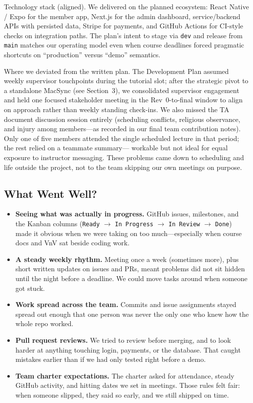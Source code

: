 \documentclass{article}
\begin{document}
Technology stack (aligned). We delivered on the planned ecosystem:
React Native / Expo for the member app, Next.js for the admin
dashboard, service/backend APIs with persisted data, Stripe for
payments, and GitHub Actions for CI-style checks on integration paths.
The plan's intent to stage via \texttt{dev} and release from \texttt{main} matches
our operating model even when course deadlines forced pragmatic shortcuts on
``production'' versus ``demo'' semantics.

Where we deviated from the written plan. The Development Plan assumed
weekly supervisor touchpoints during the tutorial slot; after the
strategic pivot to a standalone MacSync (see Section~3), we
consolidated supervisor engagement and held one focused
stakeholder meeting in the Rev~0-to-final window to align on approach rather
than weekly standing check-ins. We also missed the TA document
discussion session entirely (scheduling conflicts, religious observance, and
injury among members---as recorded in our final team contribution notes). Only
one of five members attended the single scheduled lecture in that period;
the rest relied on a teammate summary--- workable but not ideal for equal
exposure to instructor messaging. These problems came down to scheduling
and life outside the project, not to the team skipping our own meetings on
purpose.

\subsection{What Went Well?}

\begin{itemize}
  \item \textbf{Seeing what was actually in progress.} GitHub issues, milestones,
        and the Kanban columns (\texttt{Ready} $\rightarrow$ \texttt{In Progress}
        $\rightarrow$ \texttt{In Review} $\rightarrow$ \texttt{Done}) made it
        obvious when we were taking on too much---especially when course docs and
        VnV sat beside coding work.
  \item \textbf{A steady weekly rhythm.} Meeting once a week (sometimes more),
        plus short written updates on issues and PRs, meant problems did not sit
        hidden until the night before a deadline. We could move tasks around when
        someone got stuck.
  \item \textbf{Work spread across the team.} Commits and issue assignments stayed
        spread out enough that one person was never the only one who knew how the
        whole repo worked.
  \item \textbf{Pull request reviews.} We tried to review before merging, and to
        look harder at anything touching login, payments, or the database. That
        caught mistakes earlier than if we had only tested right before a demo.
  \item \textbf{Team charter expectations.} The charter asked for attendance,
        steady GitHub activity, and hitting dates we set in meetings. Those rules
        felt fair: when someone slipped, they said so early, and we still shipped
        on time.
\end{itemize}
\end{document}
